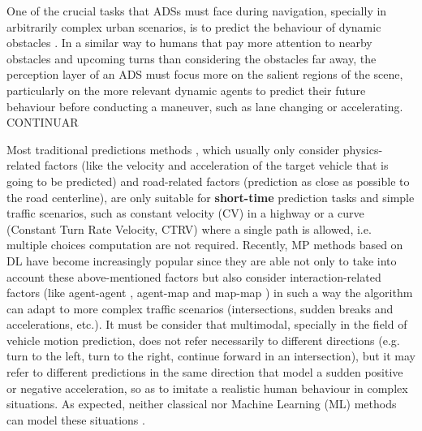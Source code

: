 One of the crucial tasks that \acp{ADS} must face during navigation, specially in arbitrarily complex urban scenarios, is to predict the behaviour of dynamic obstacles \cite{chang2019argoverse, salzmann2020trajectron++}. In a similar way to humans that pay more attention to nearby obstacles and upcoming turns than considering the obstacles far away, the perception layer of an \ac{ADS} must focus more on the salient regions of the scene, particularly on the more relevant dynamic agents to predict their future behaviour before conducting a maneuver, such as lane changing or accelerating. \\ 

CONTINUAR








Most traditional predictions methods \cite{huang2022survey}, which usually only consider physics-related factors (like the velocity and acceleration of the target vehicle that is going to be predicted) and road-related factors (prediction as close as possible to the road centerline), are only suitable for \textbf{short-time} prediction tasks \cite{huang2022survey} and simple traffic scenarios, such as constant velocity (CV) in a highway or a curve (Constant Turn Rate Velocity, CTRV) where a single path is allowed, i.e. multiple choices computation are not required. Recently, MP methods based on DL have become increasingly popular since they are able not only to take into account these above-mentioned factors but also consider interaction-related factors (like agent-agent \cite{gupta2018social}, agent-map \cite{casas2018intentnet} and map-map \cite{liang2020learning}) in such a way the algorithm can adapt to more complex traffic scenarios (intersections, sudden breaks and accelerations, etc.). It must be consider that multimodal, specially in the field of vehicle motion prediction, does not refer necessarily to different directions (e.g. turn to the left, turn to the right, continue forward in an intersection), but it may refer to different predictions in the same direction that model a sudden positive or negative acceleration, so as to imitate a realistic human behaviour in complex situations. As expected, neither classical nor Machine Learning (ML) methods can model these situations \cite{huang2022survey}.

